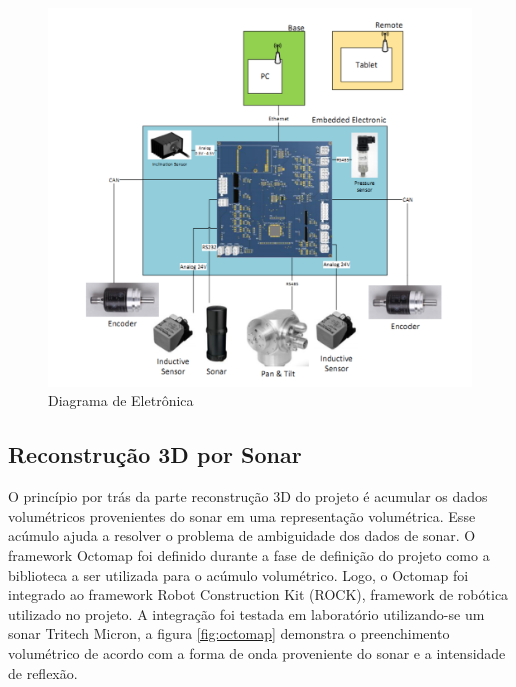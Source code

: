  \begin{figure}[ht!]
    \centering \includegraphics[width=1\columnwidth]{figs/resultados/eletronica}
    \caption{Diagrama de Eletrônica}
    \label{fig:eletronica}
\end{figure}


\noindent
\subsection{Reconstrução 3D por Sonar}

O princípio por trás da parte reconstrução 3D do projeto é  acumular os dados volumétricos provenientes do sonar em uma representação volumétrica. Esse acúmulo ajuda a resolver o problema de ambiguidade dos dados de sonar. O framework Octomap foi definido durante a fase de definição do projeto como a biblioteca a ser utilizada para o acúmulo volumétrico. Logo, o Octomap foi integrado ao framework Robot Construction Kit (ROCK), framework de robótica utilizado no projeto. A integração foi testada em laboratório utilizando-se um sonar Tritech Micron, a figura \ref{fig:octomap} demonstra o preenchimento volumétrico de acordo com a forma de onda proveniente do sonar e a intensidade de reflexão. 

